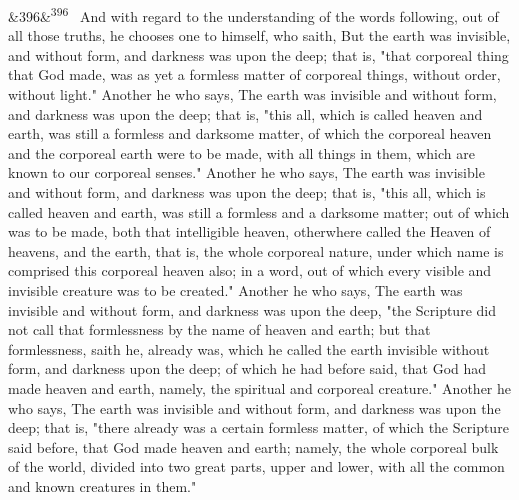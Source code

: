 \documentclass[12pt]{article}
\newcommand{\para}[1][]{\par\noindent\ifx&#1&\else\textsuperscript{\footnotesize #1}~\fi}
\begin{document}
\para[396] And with regard to the understanding of the words following, out of all those truths, he chooses one to himself, who saith, But the earth was invisible, and without form, and darkness was upon the deep; that is, "that corporeal thing that God made, was as yet a formless matter of corporeal things, without order, without light." Another he who says, The earth was invisible and without form, and darkness was upon the deep; that is, "this all, which is called heaven and earth, was still a formless and darksome matter, of which the corporeal heaven and the corporeal earth were to be made, with all things in them, which are known to our corporeal senses." Another he who says, The earth was invisible and without form, and darkness was upon the deep; that is, "this all, which is called heaven and earth, was still a formless and a darksome matter; out of which was to be made, both that intelligible heaven, otherwhere called the Heaven of heavens, and the earth, that is, the whole corporeal nature, under which name is comprised this corporeal heaven also; in a word, out of which every visible and invisible creature was to be created." Another he who says, The earth was invisible and without form, and darkness was upon the deep, "the Scripture did not call that formlessness by the name of heaven and earth; but that formlessness, saith he, already was, which he called the earth invisible without form, and darkness upon the deep; of which he had before said, that God had made heaven and earth, namely, the spiritual and corporeal creature." Another he who says, The earth was invisible and without form, and darkness was upon the deep; that is, "there already was a certain formless matter, of which the Scripture said before, that God made heaven and earth; namely, the whole corporeal bulk of the world, divided into two great parts, upper and lower, with all the common and known creatures in them."
\end{document}
